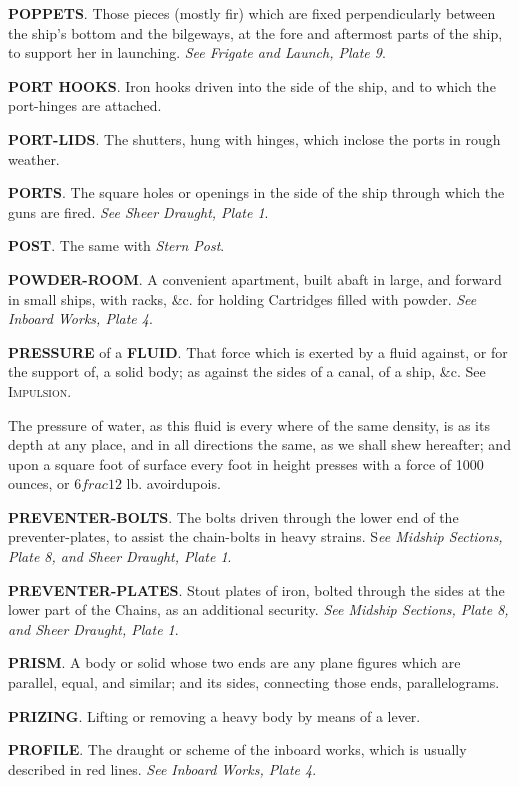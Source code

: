 \textbf{POPPETS}. Those pieces (mostly fir) which are fixed perpendicularly between the ship’s bottom and the bilgeways, at the fore and aftermost parts of the ship, to support her in launching. \textit{See Frigate and Launch, Plate 9}. 

\textbf{PORT HOOKS}. Iron hooks driven into the side of the ship, and to which the port-hinges are attached. 

\textbf{PORT-LIDS}. The shutters, hung with hinges, which inclose the ports in rough weather. 

\textbf{PORTS}. The square holes or openings in the side of the ship through which the guns are fired. \textit{See Sheer Draught, Plate 1}. 

\textbf{POST}. The same with \textit{Stern Post}. 

\textbf{POWDER-ROOM}. A convenient apartment, built abaft in large, and forward in small ships, with racks, \&c. for holding Cartridges filled with powder. \textit{See Inboard Works, Plate 4}. 

\textbf{PRESSURE} of a \textbf{FLUID}. That force which is exerted by a fluid against, or for the support of, a solid body; as against the sides of a canal, of a ship, \&c. See \textsc{Impulsion}. 

The pressure of water, as this fluid is every where of the same density, is as its depth at any place, and in all directions the same, as we shall shew hereafter; and upon a square foot of surface every foot in height presses with a force of 1000 ounces, or 6$frac{1}{2}$ lb. avoirdupois. 

\textbf{PREVENTER-BOLTS}. The bolts driven through the lower end of the preventer-plates, to assist the chain-bolts in heavy strains. S\textit{ee Midship Sections, Plate 8, and Sheer Draught, Plate 1}.

\textbf{PREVENTER-PLATES}. Stout plates of iron, bolted through the sides at the lower part of the Chains, as an additional security. \textit{See Midship Sections, Plate 8, and Sheer Draught, Plate 1}. 

\textbf{PRISM}. A body or solid whose two ends are any plane figures which are parallel, equal, and similar; and its sides, connecting those ends, parallelograms.

\textbf{PRIZING}. Lifting or removing a heavy body by means of a lever. 
 
\textbf{PROFILE}. The draught or scheme of the inboard works, which is usually described in red lines. \textit{See Inboard Works, Plate 4}. 
 
